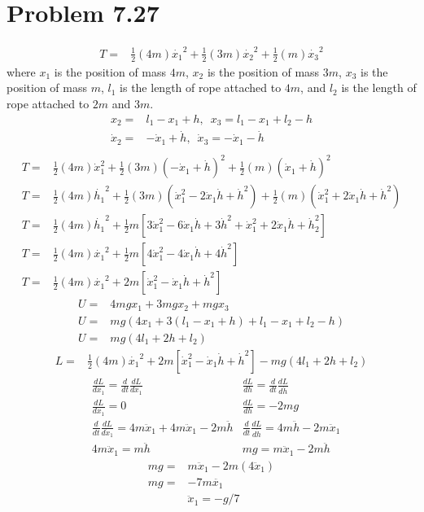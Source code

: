 \documentclass[12pt, a4paper]{article}
\begin{document}
\section*{Problem 7.27}
\begin{align*}
T =& \tfrac{1}{2}(4m)\dot{x_1}^2  + \tfrac{1}{2}(3m)\dot{x_2}^2  + \tfrac{1}{2}(m)\dot{x_3}^2  
\end{align*}
where $x_1$ is the position of mass $4m$, $x_2$ is the position of mass $3m$, $x_3$ is the position of mass $m$, $l_1$ is the length of rope attached to $4m$, and $l_2$ is the length of rope attached to $2m$ and $3m$. 
\begin{align*}
x_2 =& l_1-x_1+h, \,\,\, x_3 = l_1-x_1+l_2-h
\\
\dot{x}_2 =& -\dot{x}_1+\dot{h}, \,\,\, \dot{x}_3 = -\dot{x}_1-\dot{h}
\\
\end{align*}
\begin{align*}
T =& 
\tfrac{1}{2}(4m)\dot{x}_1^2  + 
\tfrac{1}{2}(3m)(-\dot{x}_1 + \dot{h})^2  + 
\tfrac{1}{2}( m)( \dot{x}_1 + \dot{h})^2  
\\
T =& 
\tfrac{1}{2}(4m)\dot{h_1}^2  + 
\tfrac{1}{2}(3m)(\dot{x}_1^2 - 2\dot{x}_1\dot{h} + \dot{h}^2) + 
\tfrac{1}{2}( m)(\dot{x}_1^2 + 2\dot{x}_1\dot{h} + \dot{h}^2) 
\\
T =& 
\tfrac{1}{2}(4m)\dot{h_1}^2 + \tfrac{1}{2}m[
3\dot{x}_1^2 - 6\dot{x}_1\dot{h} + 3\dot{h}^2 + 
 \dot{x}_1^2 + 2\dot{x}_1\dot{h} +  \dot{h}_2^2 ]
\\
T =& 
\tfrac{1}{2}(4m)\dot{x_1}^2 + \tfrac{1}{2}m[
4\dot{x}_1^2 - 4\dot{x}_1\dot{h} + 4\dot{h}^2]
\\
T =& \tfrac{1}{2}(4m)\dot{x_1}^2 + 2m[\dot{x}_1^2 - \dot{x}_1\dot{h} + \dot{h}^2]
\end{align*}
\begin{align*}
U =& 4mgx_1 + 3mgx_2 + mgx_3
\\
U =& mg(4x_1 + 3(l_1-x_1+h) + l_1-x_1+l_2-h)
\\
U =& mg(4l_1 + 2h + l_2)
\end{align*}
\begin{align*}
L =& \tfrac{1}{2}(4m)\dot{x_1}^2 + 2m[\dot{x}_1^2 - \dot{x}_1\dot{h} + \dot{h}^2] - mg(4l_1 + 2h + l_2)
\end{align*}
\begin{align*}
&\frac{dL}{dx_1} = \frac{d}{dt}\frac{dL}{d\dot{x}_1}
&\frac{dL}{dh} = \frac{d}{dt}\frac{dL}{d\dot{h}}
\\
&\frac{dL}{dx_1} = 0 
&\frac{dL}{dh} = -2mg
\\
&\frac{d}{dt}\frac{dL}{d\dot{x}_1} = 4m\ddot{x}_1 + 4m\ddot{x}_1 - 2m\ddot{h}
&\frac{d}{dt}\frac{dL}{d\dot{h}} = 4m\ddot{h} - 2m\ddot{x}_1 
\\
&\boxed{4m\ddot{x}_1 =  m\ddot{h}}
&\boxed{mg =  m\ddot{x}_1 - 2m\ddot{h} }
\end{align*}
\begin{align*}
mg =&  m\ddot{x}_1 - 2m(4\ddot{x}_1) 
\\
mg =& - 7m\ddot{x_1} 
\\
&\boxed{\ddot{x}_1 = -g/7}
\end{align*}
\pagebreak
\end{document}
